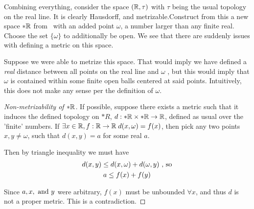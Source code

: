 \begin{frame}

    Combining everything, consider the space \((\mathbb{R}, \tau)\) with \(\tau\)
    being the usual topology on the real line. It is clearly Hausdorff, and
    metrizable.\pause Construct from this a new space \(*\mathbb{R}\) from \reals\,
    with an added point \(\omega\), a number larger than any finite real. Choose
    the set \(\{\omega\}\) to additionally be open. \pause We see that there are
    suddenly issues with defining a metric on this space.

\end{frame}

\begin{frame}

    Suppose we were able to metrize this space. That would imply we have defined
    a \emph{real} distance between all points on the real line and \(\omega\)
    \pause, but this would imply that \(\omega\) is contained within some finite
    open balls centered at said points. Intuitively, this does not make any
    sense per the definition of \(\omega\).

\end{frame}

\begin{frame}

    \begin{proof}[Non-metrizability of \(*\mathbb{R}\)]
        If possible, suppose there exists a metric such that it induces the
        defined topology on \(*R\), \(d:*\mathbb{R} \times *\mathbb{R} \to \mathbb{R}\),
        defined as usual over the 'finite' numbers. \pause If \(\exists x \in
        \mathbb{R}, f:\mathbb{R} \to \mathbb{R}\; d(x, \omega) = f(x)\), then pick any two
        points \(x, y \not = \omega\), such that \(d(x, y) = a\) for some real
        \(a\). 
        
        \pause 
        Then by triangle inequality we must have
        \begin{gather*}
            d(x, y) \leq d(x, \omega) + d(\omega, y) \textnormal{ , so} \\
            a \leq f(x) + f(y)
        \end{gather*}

        Since \(a, x, \textnormal{ and } y\) were arbitrary, \(f(x)\) must be
        unbounded \(\forall x\), and thus \(d\) is not a proper metric. This is
        a contradiction. 
    \end{proof}

\end{frame}